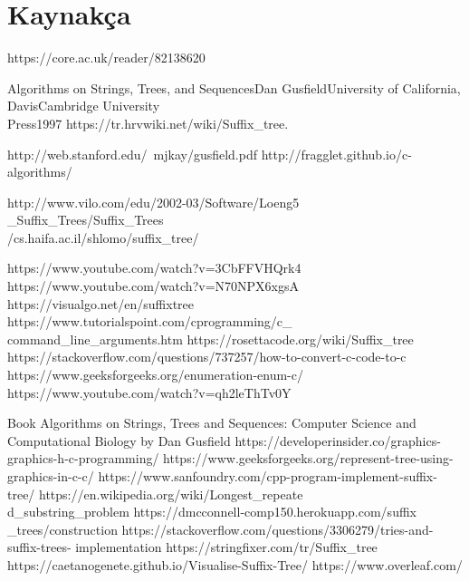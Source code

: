 \documentclass[conference]{IEEEtran}
\begin{document}
\section*{\LARGE Kaynakça}
\begin{thebibliography}{00}
\normalsize
{} https://core.ac.uk/reader/82138620

 Algorithms on Strings, Trees, and SequencesDan GusfieldUniversity of California, DavisCambridge University\\ Press1997
 https://tr.hrvwiki.net/wiki/Suffix\_tree.

  http://web.stanford.edu/~mjkay/gusfield.pdf
 http://fragglet.github.io/c-algorithms/

 http://www.vilo.com/edu/2002-03/Software/Loeng5\\\_Suffix\_Trees/Suffix\_Trees
\\/cs.haifa.ac.il/shlomo/suffix\_tree/


 https://www.youtube.com/watch?v=3CbFFVHQrk4
 https://www.youtube.com/watch?v=N70NPX6xgsA
 https://visualgo.net/en/suffixtree
 https://www.tutorialspoint.com/cprogramming/c\_\\command\_line\_arguments.htm
 https://rosettacode.org/wiki/Suffix\_tree
 https://stackoverflow.com/questions/737257/how-to-convert-c-code-to-c
 https://www.geeksforgeeks.org/enumeration-enum-c/
 https://www.youtube.com/watch?v=qh2leThTv0Y

 Book Algorithms on Strings, Trees and Sequences: Computer Science and Computational Biology by Dan Gusfield
 https://developerinsider.co/graphics-graphics-h-c-programming/
 https://www.geeksforgeeks.org/represent-tree-using-graphics-in-c-c/
 https://www.sanfoundry.com/cpp-program-implement-suffix-tree/
 https://en.wikipedia.org/wiki/Longest\_repeate\\d\_substring\_problem
 https://dmcconnell-comp150.herokuapp.com/suffix\\\_trees/construction
 https://stackoverflow.com/questions/3306279/tries-and-suffix-trees-
implementation
 https://stringfixer.com/tr/Suffix\_tree
 https://caetanogenete.github.io/Visualise-Suffix-Tree/
 https://www.overleaf.com/

\end{thebibliography}
\end{document}
